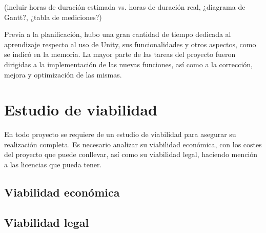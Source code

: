 (incluir horas de duración estimada vs. horas de duración real, ¿diagrama de Gantt?, ¿tabla de mediciones?)

Previa a la planificación, hubo una gran cantidad de tiempo dedicada al aprendizaje respecto al uso de Unity, sus funcionalidades y otros aspectos, como se indicó en la memoria. La mayor parte de las tareas del proyecto fueron dirigidas a la implementación de las nuevas funciones, así como a la corrección, mejora y optimización de las mismas.

\section{Estudio de viabilidad}

En todo proyecto se requiere de un estudio de viabilidad para asegurar su realización completa. Es necesario analizar su viabilidad económica, con los costes del proyecto que puede conllevar, así como su viabilidad legal, haciendo mención a las licencias que pueda tener.

\subsection{Viabilidad económica}



\subsection{Viabilidad legal}



